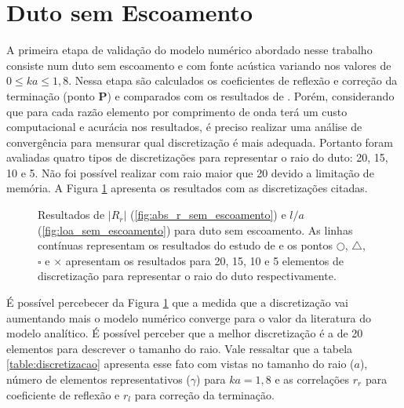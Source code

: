 \section{Duto sem Escoamento}

A primeira etapa de validação do modelo numérico abordado nesse trabalho consiste num duto sem escoamento e com fonte acústica variando nos valores de $0 \leq ka \leq 1,8$. Nessa etapa são calculados os coeficientes de reflexão e correção da terminação (ponto \textbf{P}) e comparados com os resultados de . Porém, considerando que para cada razão elemento por comprimento de onda terá um custo computacional e acurácia nos resultados, é preciso realizar uma análise de convergência para mensurar qual discretização é mais adequada. Portanto foram avaliadas quatro tipos de discretizações para representar o raio do duto: 20, 15, 10 e 5. Não foi possível realizar com raio maior que 20 devido a limitação de memória. A Figura \ref{fig:resultados_sem_escoamento} apresenta os resultados com as discretizações citadas.

\begin{figure}[h!]
\begin{subfigure}{\scaleA \textwidth}
  
\end{subfigure}%
\begin{subfigure}{\scaleA \textwidth}
  
\end{subfigure}
\caption[Resultados de $|R_{r}|$ e $l/a$ sem escoamento]{Resultados de $|R_{r}|$ (\ref{fig:abs_r_sem_escoamento}) e $l/a$ (\ref{fig:loa_sem_escoamento}) para duto sem escoamento. As linhas contínuas representam os resultados do estudo de  e os pontos $\bigcirc$, $\bigtriangleup$, $\square$ e $\times$ apresentam os resultados para 20, 15, 10 e 5 elementos de discretização para representar o raio do duto respectivamente.}
\label{fig:resultados_sem_escoamento}
\end{figure}

É possível percebecer da Figura \ref{fig:resultados_sem_escoamento} que a medida que a discretização vai aumentando mais o modelo numérico converge para o valor da literatura do modelo analítico. É possível perceber que a melhor discretização é a de 20 elementos para descrever o tamanho do raio. Vale ressaltar que a tabela \ref{table:discretizacao} apresenta esse fato com vistas no tamanho do raio ($a$), número de elementos representativos ($\gamma$) para $ka = 1,8$ e as correlações $r_r$ para coeficiente de reflexão e $r_l$ para correção da terminação.    

